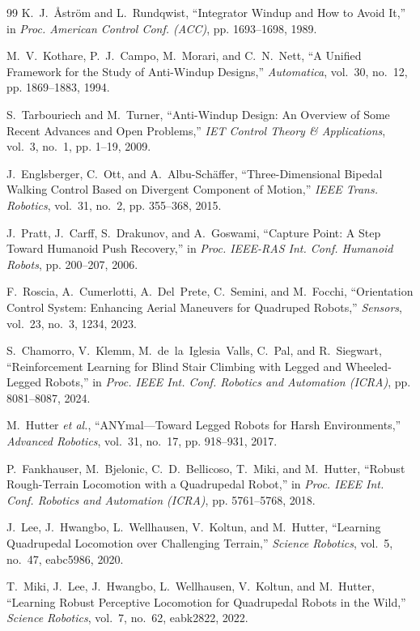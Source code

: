 \documentclass[conference]{IEEEtran}
\begin{document}
\begin{thebibliography}{99}
K.~J.~\AA{}str\"{o}m and L.~Rundqwist,
``Integrator Windup and How to Avoid It,''
in \emph{Proc. American Control Conf. (ACC)}, pp. 1693--1698, 1989.

M.~V.~Kothare, P.~J.~Campo, M.~Morari, and C.~N.~Nett,
``A Unified Framework for the Study of Anti-Windup Designs,''
\emph{Automatica}, vol.~30, no.~12, pp. 1869--1883, 1994.

S.~Tarbouriech and M.~Turner,
``Anti-Windup Design: An Overview of Some Recent Advances and Open Problems,''
\emph{IET Control Theory \& Applications}, vol.~3, no.~1, pp. 1--19, 2009.

J.~Englsberger, C.~Ott, and A.~Albu-Sch\"{a}ffer,
``Three-Dimensional Bipedal Walking Control Based on Divergent Component of Motion,''
\emph{IEEE Trans. Robotics}, vol.~31, no.~2, pp. 355--368, 2015.

J.~Pratt, J.~Carff, S.~Drakunov, and A.~Goswami,
``Capture Point: A Step Toward Humanoid Push Recovery,''
in \emph{Proc. IEEE-RAS Int. Conf. Humanoid Robots}, pp. 200--207, 2006.

F.~Roscia, A.~Cumerlotti, A.~Del~Prete, C.~Semini, and M.~Focchi,
``Orientation Control System: Enhancing Aerial Maneuvers for Quadruped Robots,''
\emph{Sensors}, vol.~23, no.~3, 1234, 2023.

S.~Chamorro, V.~Klemm, M.~de~la~Iglesia~Valls, C.~Pal, and R.~Siegwart,
``Reinforcement Learning for Blind Stair Climbing with Legged and Wheeled-Legged Robots,''
in \emph{Proc. IEEE Int. Conf. Robotics and Automation (ICRA)}, pp. 8081--8087, 2024.

M.~Hutter \emph{et al.},
``ANYmal---Toward Legged Robots for Harsh Environments,''
\emph{Advanced Robotics}, vol.~31, no.~17, pp. 918--931, 2017.

P.~Fankhauser, M.~Bjelonic, C.~D.~Bellicoso, T.~Miki, and M.~Hutter,
``Robust Rough-Terrain Locomotion with a Quadrupedal Robot,''
in \emph{Proc. IEEE Int. Conf. Robotics and Automation (ICRA)}, pp. 5761--5768, 2018.

J.~Lee, J.~Hwangbo, L.~Wellhausen, V.~Koltun, and M.~Hutter,
``Learning Quadrupedal Locomotion over Challenging Terrain,''
\emph{Science Robotics}, vol.~5, no.~47, eabc5986, 2020.

T.~Miki, J.~Lee, J.~Hwangbo, L.~Wellhausen, V.~Koltun, and M.~Hutter,
``Learning Robust Perceptive Locomotion for Quadrupedal Robots in the Wild,''
\emph{Science Robotics}, vol.~7, no.~62, eabk2822, 2022.


\end{thebibliography}
\end{document}
